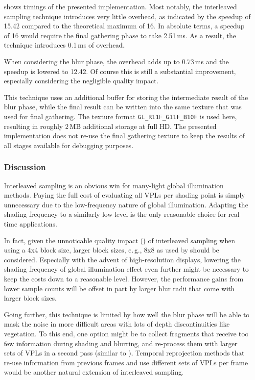  shows timings of the presented implementation. Most notably, the interleaved sampling technique introduces very little overhead, as indicated by the speedup of 15.42 compared to the theoretical maximum of 16. In absolute terms, a speedup of 16 would require the final gathering phase to take 2.51\,ms. As a result, the technique introduces 0.1\,ms of overhead.

When considering the blur phase, the overhead adds up to 0.73\,ms and the speedup is lowered to 12.42. Of course this is still a substantial improvement, especially considering the negligible quality impact.

This technique uses an additional buffer for storing the intermediate result of the blur phase, while the final result can be written into the same texture that was used for final gathering. The texture format \texttt{GL\_R11F\_G11F\_B10F} is used here, resulting in roughly 2\,MB additional storage at full HD. The presented implementation does not re-use the final gathering texture to keep the results of all stages available for debugging purposes.


\subsubsection{Discussion}
Interleaved sampling is an obvious win for many-light global illumination methods. Paying the full cost of evaluating all VPLs per shading point is simply unnecessary due to the low-frequency nature of global illumination. Adapting the shading frequency to a similarly low level is the only reasonable choice for real-time applications.

In fact, given the unnoticable quality impact () of interleaved sampling when using a 4x4 block size, larger block sizes, e.\,g., 8x8 as used by \citet{hedman2016sequential} should be considered. Especially with the advent of high-resolution displays, lowering the shading frequency of global illumination effect even further might be necessary to keep the costs down to a reasonable level. However, the performance gains from lower sample counts will be offset in part by larger blur radii that come with larger block sizes.

Going further, this technique is limited by how well the blur phase will be able to mask the noise in more difficult areas with lots of depth discontinuities like vegetation. To this end, one option might be to collect fragments that receive too few information during shading and blurring, and re-process them with larger sets of VPLs in a second pass (similar to \cite{Lauritzen:2010:Deferred}). Temporal reprojection methods \citep{Jimenez:2016:FilmicSMAA} that re-use information from previous frames and use different sets of VPLs per frame would be another natural extension of interleaved sampling.



